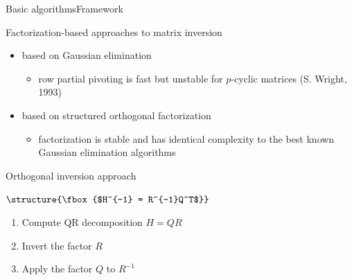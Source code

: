 \documentclass[xcolor=table,final]{beamer} %
\begin{document}
\begin{frame}{Basic algorithms}{Framework}
  \begin{block}{Factorization-based approaches to matrix inversion}
    \begin{itemize}
    \item based on Gaussian elimination
      \begin{itemize}
      \item row partial pivoting is fast but unstable for $p$-cyclic matrices (S. Wright, 1993)
      \end{itemize}
    \item based on structured orthogonal factorization
      \begin{itemize}
      \item factorization is stable and has 
        identical complexity to the best known Gaussian elimination algorithms
      \end{itemize}
    \end{itemize}
  \end{block}

  \pause
  \begin{block}{Orthogonal inversion approach}
    \begin{centering}
      $\structure{\fbox{$H^{-1} = R^{-1}Q^T$}}$
    \end{centering}
    \begin{enumerate}
    \item Compute QR decomposition $H = QR$
    \item Invert the factor $R$ 
    \item Apply the factor $Q$ to $R^{-1}$ 
    \end{enumerate}
  \end{block}
\end{frame}
\end{document}
